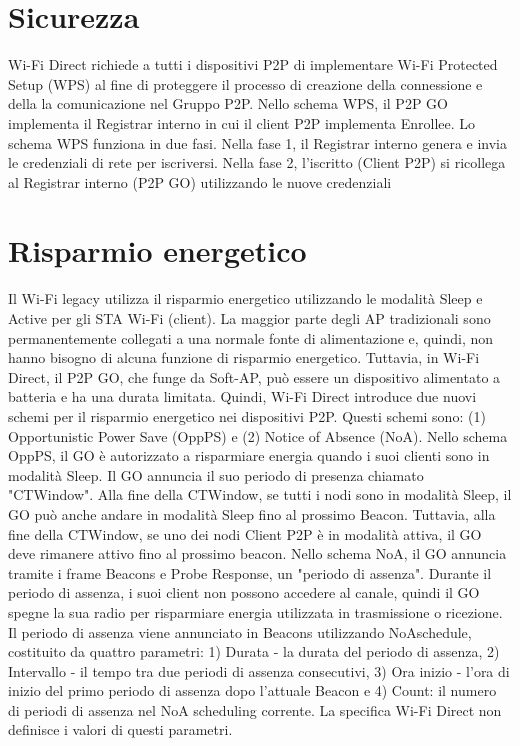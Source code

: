 \section{Sicurezza}

Wi-Fi Direct richiede a tutti i dispositivi P2P di
implementare Wi-Fi Protected Setup (WPS) \cite{WPS} al fine di
proteggere il processo di creazione della connessione e della
la comunicazione nel Gruppo P2P. Nello schema WPS, il
P2P GO implementa il Registrar interno in cui il client
P2P implementa Enrollee. Lo schema WPS funziona in due fasi.
Nella fase 1, il Registrar interno genera e invia le credenziali
di rete per iscriversi. Nella fase 2, l'iscritto (Client P2P)
si ricollega al Registrar interno (P2P GO) utilizzando le
nuove credenziali



\section{Risparmio energetico}

Il Wi-Fi legacy utilizza il risparmio energetico utilizzando le modalità
Sleep e Active per gli STA Wi-Fi (client). La maggior parte degli AP
tradizionali sono permanentemente collegati a una normale fonte di
alimentazione e, quindi, non hanno bisogno di alcuna funzione di risparmio
energetico. Tuttavia, in Wi-Fi Direct, il P2P GO, che funge da Soft-AP,
può essere un dispositivo alimentato a batteria e ha una durata limitata.
Quindi,
Wi-Fi Direct introduce due nuovi schemi per il risparmio energetico nei
dispositivi P2P. Questi schemi sono: (1) Opportunistic Power Save
(OppPS) e (2) Notice of Absence (NoA). Nello schema OppPS, il GO è
autorizzato a risparmiare energia quando i suoi clienti sono in
modalità Sleep. Il GO annuncia il suo periodo di presenza chiamato
"CTWindow". Alla fine della CTWindow, se tutti i nodi sono in modalità
Sleep, il GO può anche andare in modalità Sleep fino al prossimo Beacon.
Tuttavia, alla fine della CTWindow, se uno dei nodi Client P2P è in
modalità attiva, il GO deve rimanere attivo fino al prossimo beacon.
Nello schema NoA, il GO annuncia tramite i frame Beacons e Probe
Response, un "periodo di assenza". Durante il periodo di assenza,
i suoi client non possono accedere al canale, quindi il GO spegne
la sua radio per risparmiare energia utilizzata in trasmissione o
ricezione. Il periodo di assenza viene annunciato in Beacons
utilizzando NoAschedule, costituito da quattro parametri: 1)
Durata - la durata del periodo di assenza, 2) Intervallo - il
tempo tra due periodi di assenza consecutivi, 3) Ora inizio -
l'ora di inizio del primo periodo di assenza dopo l'attuale Beacon
e 4)  Count: il numero di periodi di assenza nel
NoA scheduling corrente. La specifica Wi-Fi Direct non
definisce i valori di questi parametri.




